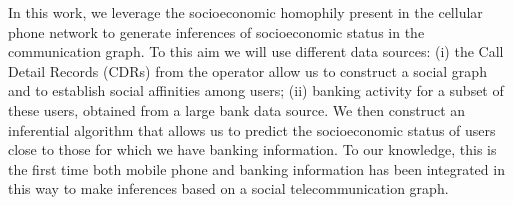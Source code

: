 In this work, we leverage the socioeconomic homophily present in the cellular phone network to generate inferences of socioeconomic status in the communication graph. To this aim we will use different data sources: (i) the Call Detail Records (CDRs) from the operator allow us to construct a social graph and to establish social affinities among users; (ii) banking activity for a subset of these users, obtained from a large bank data source. We then construct an inferential algorithm that allows us to predict the socioeconomic status of users close to those for which we have banking information. To our knowledge, this is the first time both mobile phone and banking information has been integrated in this way to make inferences based on a social telecommunication graph.

